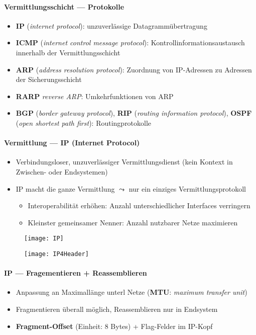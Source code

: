 \paragraph{Vermittlungsschicht --- Protokolle}
\begin{itemize}
  \item \textbf{IP} (\emph{internet protocol}): unzuverlässige Datagrammübertragung
  \item \textbf{ICMP} (\emph{internet control message protocol}): Kontrollinformationsaustausch innerhalb der Vermittlungsschicht
  \item \textbf{ARP} (\emph{address resolution protocol}): Zuordnung von IP-Adressen zu Adressen der Sicherungsschicht
  \item \textbf{RARP} \emph{reverse ARP}: Umkehrfunktionen von ARP
  \item \textbf{BGP} (\emph{border gateway protocol}), \textbf{RIP} (\emph{routing information protocol}), \textbf{OSPF} (\emph{open shortest path first}): Routingprotokolle
\end{itemize}

\paragraph{Vermittlung --- IP (Internet Protocol)}
\begin{itemize}
	\item Verbindungsloser, unzuverlässiger Vermittlungsdienst (kein Kontext in Zwischen- oder Endsystemen)
  \item IP macht die ganze Vermittlung \( \leadsto \) nur ein einziges Vermittlungsprotokoll
  \begin{itemize}
    \item Interoperabilität erhöhen: Anzahl unterschiedlicher Interfaces verringern
    \item Kleinster gemeinsamer Nenner: Anzahl nutzbarer Netze maximieren
  \end{itemize}
\end{itemize}
\begin{figure}[H]\centering\label{IP}\texttt{[image: IP]}\end{figure}
\begin{figure}[H]\centering\texttt{[image: IP4Header]}\end{figure}

\paragraph{IP --- Fragementieren + Reassemblieren}
\begin{itemize}
  \item Anpassung an Maximallänge unterl Netze (\textbf{MTU}: \emph{maximum transfer unit})
  \item Fragmentieren überall möglich, Reassemblieren nur in Endsystem
  \item \textbf{Fragment-Offset} (Einheit: 8 Bytes) + Flag-Felder im IP-Kopf %
\end{itemize}

